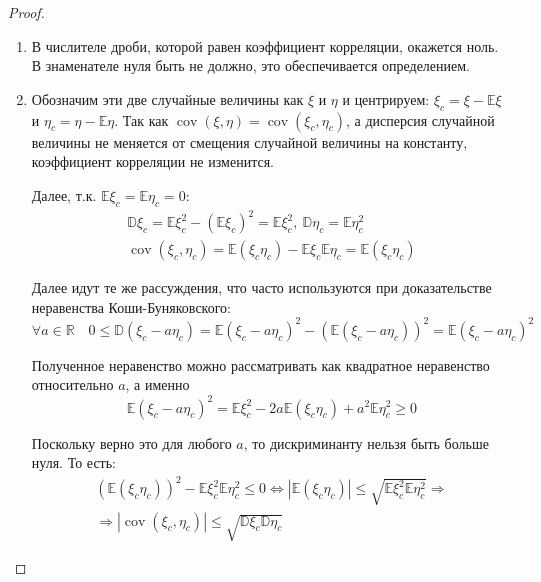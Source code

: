 \begin{proof}
    \begin{enumerate}
    \item В числителе дроби, которой равен коэффициент корреляции,
окажется ноль. В знаменателе нуля быть не должно, это обеспечивается определением.

    \item  Обозначим эти две случайные величины как $\xi$ и $\eta$ и центрируем: $\xi_c = \xi - \mathbb{E}\xi$ и $\eta_c = \eta - \mathbb{E}\eta$. Так как $\operatorname{cov}(\xi, \eta)=\operatorname{cov}\left(\xi_{c}, \eta_{c}\right)$, а дисперсия случайной величины не меняется от смещения случайной величины на константу, коэффициент корреляции не изменится.
    
    Далее, т.к. $\mathbb{E} \xi_{c}=\mathbb{E} \eta_{c}=0$:
    \begin{gather*}
        \mathbb{D} \xi_{c}=\mathbb{E} \xi_{c}^{2}-\left(\mathbb{E} \xi_{c}\right)^{2}=\mathbb{E} \xi_{c}^{2},~ \mathbb{D} \eta_{c}=\mathbb{E} \eta_{c}^{2} \\
        \operatorname{cov}\left(\xi_{c}, \eta_{c}\right)=\mathbb{E}\left(\xi_{c} \eta_{c}\right)-\mathbb{E} \xi_{c} \mathbb{E} \eta_{c}=\mathbb{E}\left(\xi_{c} \eta_{c}\right)
    \end{gather*}
    
    Далее идут те же рассуждения, что часто используются при доказательстве неравенства Коши-Буняковского:
    \begin{equation*}
        \forall a \in \mathbb{R} \quad 0 \leqslant \mathbb{D}\left(\xi_{c}-a \eta_{c}\right)=\mathbb{E}\left(\xi_{c}-a \eta_{c}\right)^{2}-\left(\mathbb{E}\left(\xi_{c}-a \eta_{c}\right)\right)^{2}=\mathbb{E}\left(\xi_{c}-a \eta_{c}\right)^{2}
    \end{equation*}
    
    Полученное неравенство можно рассматривать как квадратное неравенство относительно $a$, а именно
    \begin{equation*}
        \mathbb{E}\left(\xi_{c}-a \eta_{c}\right)^{2}=\mathbb{E} \xi_{c}^{2}-2 a \mathbb{E}\left(\xi_{c} \eta_{c}\right)+a^{2} \mathbb{E} \eta_{c}^{2} \geqslant 0
    \end{equation*}
    
    Поскольку верно это для любого $a$, то дискриминанту нельзя быть больше нуля. То есть:
    \begin{multline*}
        \left(\mathbb{E}\left(\xi_{c} \eta_{c}\right)\right)^{2}-\mathbb{E} \xi_{c}^{2} \mathbb{E} \eta_{c}^{2} \leqslant 0 \Longleftrightarrow\left|\mathbb{E}\left(\xi_{c} \eta_{c}\right)\right| \leqslant \sqrt{\mathbb{E} \xi_{c}^{2} \mathbb{E} \eta_{c}^{2}} \Rightarrow \\
        \Rightarrow\left|\operatorname{cov}\left(\xi_{c}, \eta_{c}\right)\right| \leqslant \sqrt{\mathbb{D} \xi_{c} \mathbb{D} \eta_{c}}
    \end{multline*}
    

\end{enumerate}
\end{proof}
